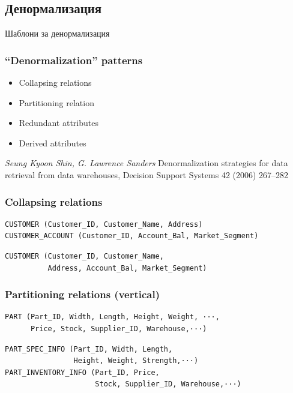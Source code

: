 \documentclass{beamer}
\begin{document}
\subsection{Денормализация}

\begin{frame}
\centerline{Шаблони за денормализация}
\end{frame}


\begin{frame}[fragile]
\frametitle{``Denormalization'' patterns}


\begin{itemize}
  \item Collapsing relations
  \item Partitioning relation
  \item Redundant attributes
  \item Derived attributes
\end{itemize}

\vspace{\baselineskip}
\vspace{\baselineskip}

\textit {Seung Kyoon Shin, G. Lawrence Sanders} Denormalization strategies for data retrieval from data warehouses, Decision Support Systems 42 (2006) 267–282

\end{frame}


\begin{frame}[fragile]
\frametitle{Collapsing relations}

\begin{verbatim}
CUSTOMER (Customer_ID, Customer_Name, Address)
CUSTOMER_ACCOUNT (Customer_ID, Account_Bal, Market_Segment)
\end{verbatim}

\vspace{\baselineskip}

\begin{verbatim}
CUSTOMER (Customer_ID, Customer_Name,
          Address, Account_Bal, Market_Segment)
\end{verbatim}

\end{frame}


\begin{frame}[fragile]
\frametitle{Partitioning relations (vertical)}


\begin{verbatim}
PART (Part_ID, Width, Length, Height, Weight, ···,
      Price, Stock, Supplier_ID, Warehouse,···)
\end{verbatim}

\vspace{\baselineskip}

\begin{verbatim}
PART_SPEC_INFO (Part_ID, Width, Length,
                Height, Weight, Strength,···)
PART_INVENTORY_INFO (Part_ID, Price,
                     Stock, Supplier_ID, Warehouse,···)
\end{verbatim}

\end{frame}
\end{document}

